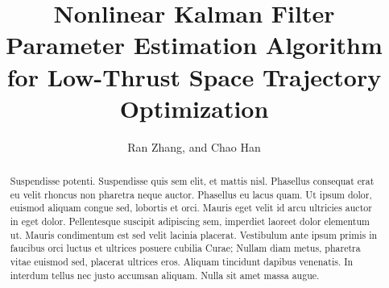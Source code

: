 \documentclass[preprint,12pt]{elsarticle}
\begin{document}
\begin{frontmatter}



\title{Nonlinear Kalman Filter Parameter Estimation Algorithm for Low-Thrust Space Trajectory Optimization}


\author{Ran Zhang, and Chao Han}

\address{Beihang Universtiry, Xueyuan Road No. 37, 100191,Beijing, China}

\begin{abstract}
Suspendisse potenti. Suspendisse quis sem elit, et mattis nisl. Phasellus consequat erat eu velit rhoncus non pharetra neque auctor. Phasellus eu lacus quam. Ut ipsum dolor, euismod aliquam congue sed, lobortis et orci. Mauris eget velit id arcu ultricies auctor in eget dolor. Pellentesque suscipit adipiscing sem, imperdiet laoreet dolor elementum ut. Mauris condimentum est sed velit lacinia placerat. Vestibulum ante ipsum primis in faucibus orci luctus et ultrices posuere cubilia Curae; Nullam diam metus, pharetra vitae euismod sed, placerat ultrices eros. Aliquam tincidunt dapibus venenatis. In interdum tellus nec justo accumsan aliquam. Nulla sit amet massa augue.
\end{abstract}

%
%

\end{frontmatter}
\end{document}
